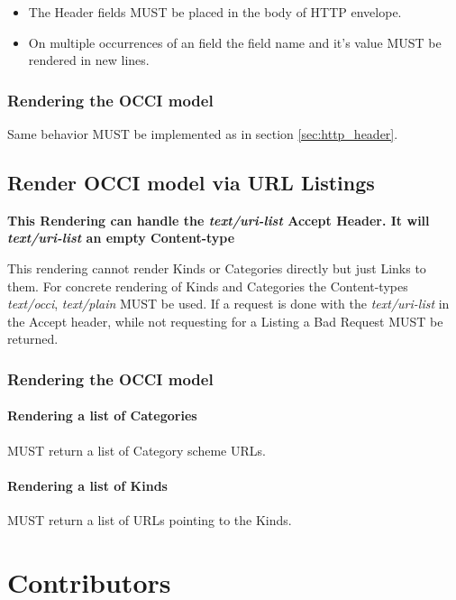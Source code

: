 \documentclass[10pt,a4paper]{article}
\begin{document}
\begin{itemize}
  \item The Header fields MUST be placed in the body of HTTP envelope.
  \item On multiple occurrences of an field the field name and it's value MUST be rendered in new lines.
\end{itemize}

\subsubsection{Rendering the OCCI model}

Same behavior MUST be implemented as in section \ref{sec:http_header}.

\subsection{Render OCCI model via URL Listings}

\textbf{This Rendering can handle the \textit{text/uri-list} Accept Header. It will \textit{text/uri-list} an empty Content-type}

This rendering cannot render Kinds or Categories directly but just Links to them. For concrete rendering of Kinds and Categories the Content-types \textit{text/occi}, \textit{text/plain} MUST be used. If a request is done with the \textit{text/uri-list} in the Accept header, while not requesting for a Listing a Bad Request MUST be returned.

\subsubsection{Rendering the OCCI model}

\paragraph{Rendering a list of Categories}

MUST return a list of Category scheme URLs.

\paragraph{Rendering a list of Kinds}

MUST return a list of URLs pointing to the Kinds.

\section{Contributors}
\end{document}

